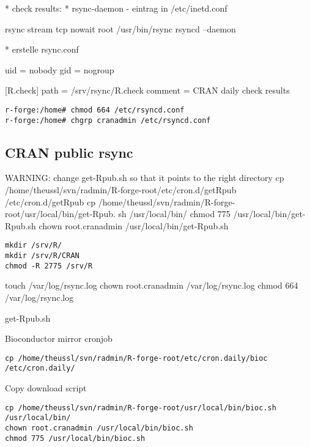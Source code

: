\documentclass[a4paper]{article}
\begin{document}
* check results:
* rsync-daemon - eintrag in /etc/inetd.conf

rsync           stream tcp nowait root /usr/bin/rsync rsyncd --daemon

* erstelle rsync.conf

uid = nobody
gid = nogroup

[R.check]
        path = /srv/rsync/R.check
        comment = CRAN daily check results
\begin{lstlisting}
r-forge:/home# chmod 664 /etc/rsyncd.conf
r-forge:/home# chgrp cranadmin /etc/rsyncd.conf
\end{lstlisting}

\subsection{CRAN public rsync}


WARNING: change get-Rpub.sh so that it points to the right directory
cp /home/theussl/svn/radmin/R-forge-root/etc/cron.d/getRpub /etc/cron.d/getRpub
cp /home/theussl/svn/radmin/R-forge-root/usr/local/bin/get-Rpub.
sh /usr/local/bin/
chmod 775 /usr/local/bin/get-Rpub.sh
chown root.cranadmin /usr/local/bin/get-Rpub.sh

\begin{lstlisting}[frame=single, framerule=0.95pt]
mkdir /srv/R/
mkdir /srv/R/CRAN
chmod -R 2775 /srv/R
\end{lstlisting}

touch /var/log/rsync.log
chown root.cranadmin /var/log/rsync.log
chmod 664 /var/log/rsync.log

get-Rpub.sh

Bioconductor mirror
cronjob

\begin{lstlisting}[frame=single, framerule=0.95pt]
cp /home/theussl/svn/radmin/R-forge-root/etc/cron.daily/bioc /etc/cron.daily/
\end{lstlisting}

Copy download script

\begin{lstlisting}[frame=single, framerule=0.95pt]
cp /home/theussl/svn/radmin/R-forge-root/usr/local/bin/bioc.sh /usr/local/bin/
chown root.cranadmin /usr/local/bin/bioc.sh
chmod 775 /usr/local/bin/bioc.sh
\end{lstlisting}
\end{document}
